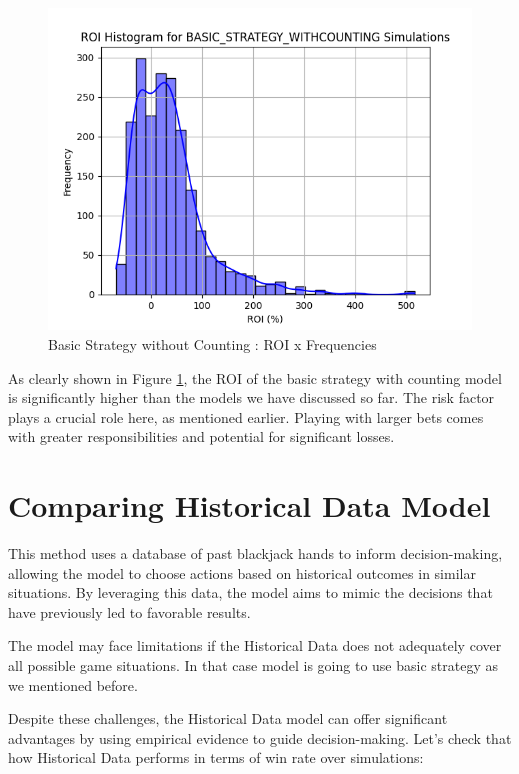 \documentclass[a4paper,12pt]{report}
\begin{document}
\begin{figure}[h]
\begin{center}
\includegraphics[scale=0.5]{figures/graphs/bsc_roi.png}
\end{center}
\caption{Basic Strategy without Counting : ROI x Frequencies}
\label{fig:bsc_roi}
\end{figure}

As clearly shown in Figure \ref{fig:bsc_roi}, the ROI of the basic strategy with counting model is significantly higher than the models we have discussed so far. The risk factor plays a crucial role here, as mentioned earlier. Playing with larger bets comes with greater responsibilities and potential for significant losses.

\section{Comparing Historical Data Model}
This method uses a database of past blackjack hands to inform decision-making, allowing the model to choose actions based on historical outcomes in similar situations. By leveraging this data, the model aims to mimic the decisions that have previously led to favorable results.

The model may face limitations if the Historical Data does not adequately cover all possible game situations. In that case model is going to use basic strategy as we mentioned before.

Despite these challenges, the Historical Data model can offer significant advantages by using empirical evidence to guide decision-making. Let's check that how Historical Data performs in terms of win rate over simulations:
\end{document}

